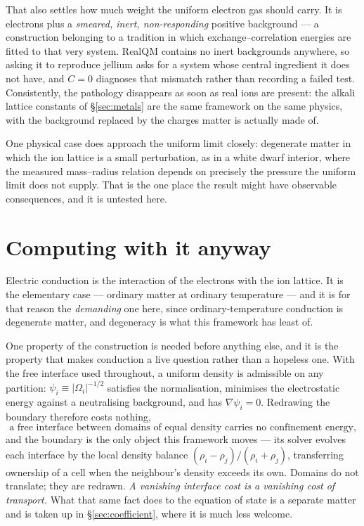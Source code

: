 \documentclass[11pt]{article}
\newcommand{\grad}{\nabla}
\begin{document}
That also settles how much weight the uniform electron gas should carry. It is electrons plus a
\emph{smeared, inert, non-responding} positive background --- a construction belonging to a tradition
in which exchange--correlation energies are fitted to that very system. RealQM contains no inert
backgrounds anywhere, so asking it to reproduce jellium asks for a system whose central ingredient it
does not have, and $C=0$ diagnoses that mismatch rather than recording a failed test. Consistently,
the pathology disappears as soon as real ions are present: the alkali lattice constants of \S\ref{sec:metals} are the same framework on the same physics, with
the background replaced by the charges matter is actually made of.

One physical case does approach the uniform limit closely: degenerate matter in which the ion lattice
is a small perturbation, as in a white dwarf interior, where the measured mass--radius relation
depends on precisely the pressure the uniform limit does not supply. That is the one place the result
might have observable consequences, and it is untested here.

\section{Computing with it anyway}\label{sec:conduction}

Electric conduction is the interaction of the electrons with the ion lattice. It is the elementary
case --- ordinary matter at ordinary temperature --- and it is for that reason the \emph{demanding}
one here, since ordinary-temperature conduction is degenerate matter, and degeneracy is what this
framework has least of.

One property of the construction is needed before anything else, and it is the property that makes
conduction a live question rather than a hopeless one. With the free interface used throughout, a
uniform density is admissible on any partition: $\psi_i\equiv|\Omega_i|^{-1/2}$ satisfies the
normalisation, minimises the electrostatic energy against a neutralising background, and has
$\grad\psi_i=0$. Redrawing the boundary therefore costs nothing,
\begin{equation}\label{eq:Czero}
\text{a free interface between domains of equal density carries no confinement energy,}
\end{equation}
and the boundary is the only object this framework moves --- its solver evolves each interface by the
local density balance $(\rho_i-\rho_j)/(\rho_i+\rho_j)$, transferring ownership of a cell when the
neighbour's density exceeds its own. Domains do not translate; they are redrawn. \emph{A vanishing
interface cost is a vanishing cost of transport.} What that same fact does to the equation of state
is a separate matter and is taken up in \S\ref{sec:coefficient}, where it is much less welcome.
\end{document}
